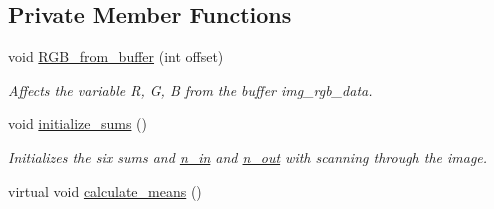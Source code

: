 \subsection*{Private Member Functions}
\begin{DoxyCompactItemize}
\item 
\hypertarget{classofeli_1_1_a_cwithout_edges_y_u_v_a7913716e6f12f0020909fd1ff42149f4}{void \hyperlink{classofeli_1_1_a_cwithout_edges_y_u_v_a7913716e6f12f0020909fd1ff42149f4}{R\-G\-B\-\_\-from\-\_\-buffer} (int offset)}\label{classofeli_1_1_a_cwithout_edges_y_u_v_a7913716e6f12f0020909fd1ff42149f4}

\begin{DoxyCompactList}\small\item\em Affects the variable R, G, B from the buffer img\-\_\-rgb\-\_\-data. \end{DoxyCompactList}\item 
\hypertarget{classofeli_1_1_a_cwithout_edges_y_u_v_a68356b357307d95e2b431bb46c0223bb}{void \hyperlink{classofeli_1_1_a_cwithout_edges_y_u_v_a68356b357307d95e2b431bb46c0223bb}{initialize\-\_\-sums} ()}\label{classofeli_1_1_a_cwithout_edges_y_u_v_a68356b357307d95e2b431bb46c0223bb}

\begin{DoxyCompactList}\small\item\em Initializes the six sums and \hyperlink{classofeli_1_1_a_cwithout_edges_y_u_v_a63542bb13e9dd879714b6c71cd5fe62c}{n\-\_\-in} and \hyperlink{classofeli_1_1_a_cwithout_edges_y_u_v_a034adbc67a268bd84539fe8e76b9deec}{n\-\_\-out} with scanning through the image. \end{DoxyCompactList}\item 
\hypertarget{classofeli_1_1_a_cwithout_edges_y_u_v_ae8904a4a32fa48696641066ec5ae571d}{virtual void \hyperlink{classofeli_1_1_a_cwithout_edges_y_u_v_ae8904a4a32fa48696641066ec5ae571d}{calculate\-\_\-means} ()}\label{classofeli_1_1_a_cwithout_edges_y_u_v_ae8904a4a32fa48696641066ec5ae571d}


\end{DoxyCompactItemize}
